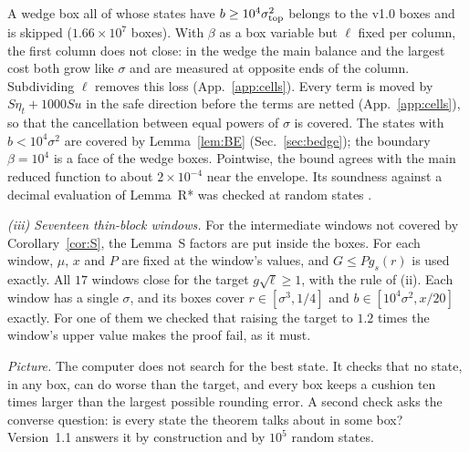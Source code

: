 A wedge box all of whose states have $b\ge10^4\sigma_{\rm top}^2$ belongs to the v1.0 boxes and is skipped ($1.66\times10^{7}$ boxes).
With $\beta$ as a box variable but $\ell$ fixed per column, the first column does not close: in the wedge the main balance and the largest cost both grow like $\sigma$ and are measured at opposite ends of the column.
Subdividing $\ell$ removes this loss (App.~\ref{app:cells}).
Every term is moved by $S\eta_t+1000Su$ in the safe direction before the terms are netted (App.~\ref{app:cells}), so that the cancellation between equal powers of $\sigma$ is covered.
The states with $b<10^4\sigma^2$ are covered by Lemma~\ref{lem:BE} (Sec.~\ref{sec:bedge}); the boundary $\beta=10^4$ is a face of the wedge boxes.
Pointwise, the bound agrees with the main reduced function to about $2\times10^{-4}$ near the envelope.
Its soundness against a decimal evaluation of Lemma~R* was checked at random states \numst.

\emph{(iii) Seventeen thin-block windows.}
For the intermediate windows not covered by Corollary~\ref{cor:S}, the Lemma~S factors are put inside the boxes.
For each window, $\mu$, $x$ and $P$ are fixed at the window's values, and $G\le Pg_s(r)$ is used exactly.
All $17$ windows close for the target $g\sqrt\ell\ge1$, with the rule of (ii).
Each window has a single $\sigma$, and its boxes cover $r\in[\sigma^3,1/4]$ and $b\in[10^4\sigma^2,x/20]$ exactly.
For one of them we checked that raising the target to $1.2$ times the window's upper value makes the proof fail, as it must.

\emph{Picture.} The computer does not search for the best state.
It checks that no state, in any box, can do worse than the target, and every box keeps a cushion ten times larger than the largest possible rounding error.
A second check asks the converse question: is every state the theorem talks about in some box?
Version~1.1 answers it by construction and by $10^5$ random states.
